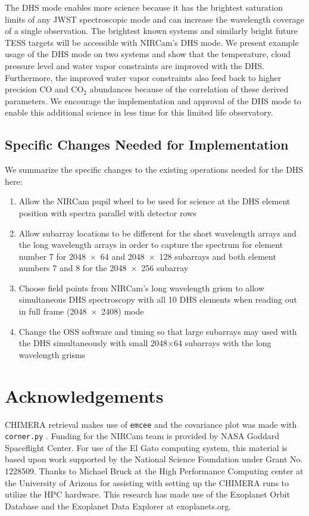 \documentclass[iop]{emulateapj}
\begin{document}
The DHS mode enables more science because it has the brightest saturation limits of any JWST spectroscopic mode and can increase the wavelength coverage of a single observation.
The brightest known systems and similarly bright future TESS targets will be accessible with NIRCam's DHS mode.
We present example usage of the DHS mode on two systems and show that the temperature, cloud pressure level and water vapor constraints are improved with the DHS.
Furthermore, the improved water vapor constraints also feed back to higher precision CO and CO$_2$ abundances because of the correlation of these derived parameters.
We encourage the implementation and approval of the DHS mode to enable this additional science in less time for this limited life observatory.

\subsection{Specific Changes Needed for Implementation}
We summarize the specific changes to the existing operations needed for the DHS here:
\begin{enumerate}
\item Allow the NIRCam pupil wheel to be used for science at the DHS element position with spectra parallel with detector rows
\item Allow subarray locations to be different for the short wavelength arrays and the long wavelength arrays in order to capture the spectrum for element number 7 for 2048~$\times$~64 and 2048~$\times$~128 subarrays and both element numbers 7 and 8 for the 2048~$\times$~256 subarray
\item Choose field points from NIRCam's long wavelength grism to allow simultaneous DHS spectroscopy with all 10 DHS elements when reading out in full frame (2048~$\times$~2408) mode
\item Change the OSS software and timing so that large subarrays may used with the DHS simultaneously with small 2048$\times$64 subarrays with the long wavelength grisms
\end{enumerate}

\vspace{0.1in}
\section*{Acknowledgements}

CHIMERA retrieval makes use of \texttt{emcee} \citep{foreman-mackey2013emcee} and the covariance plot was made with \texttt{corner.py} \citep{foremanCorner}.
Funding for the NIRCam team is provided by NASA Goddard Spaceflight Center.
For use of the El Gato computing system, this material is based upon work supported by the National Science Foundation under Grant No. 1228509.
Thanks to Michael Bruck at the High Performance Computing center at the University of Arizona for assisting with setting up the CHIMERA runs to utilize the HPC hardware.
This research has made use of the Exoplanet Orbit Database and the Exoplanet Data Explorer at exoplanets.org.
\end{document}
